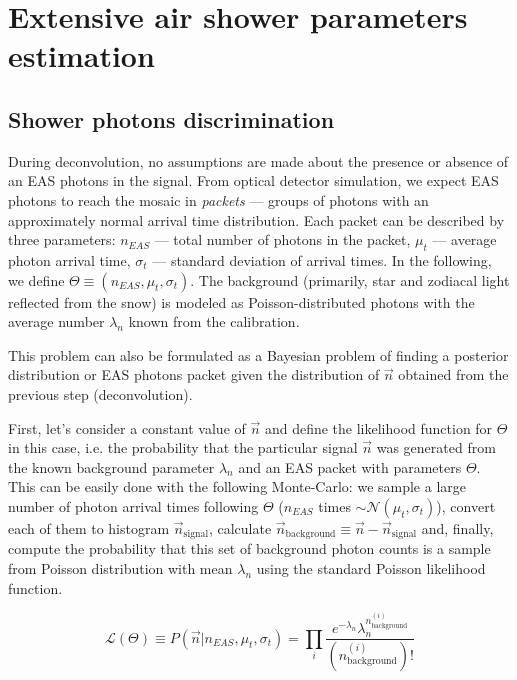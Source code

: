 \chapter{Extensive air shower parameters estimation}

\section{Shower photons discrimination}
\label{sec:signal-reconstruction}

During deconvolution, no assumptions are made about the presence or absence of an EAS photons in the signal. From optical detector simulation, we expect EAS photons to reach the mosaic in \textit{packets} --- groups of photons with an approximately normal arrival time distribution. Each packet can be described by three parameters: $n_{EAS}$ --- total number of photons in the packet, $\mu_t$ --- average photon arrival time, $\sigma_t$ --- standard deviation of arrival times. In the following, we define $\Theta \equiv (n_{EAS}, \mu_t, \sigma_t)$. The background (primarily, star and zodiacal light reflected from the snow) is modeled as Poisson-distributed photons with the average number $\lambda_{n}$ known from the calibration.

This problem can also be formulated as a Bayesian problem of finding a posterior distribution or EAS photons packet given the distribution of $\vec{n}$ obtained from the previous step (deconvolution).

First, let's consider a constant value of $\vec{n}$ and define the likelihood function for $\Theta$ in this case, i.e. the probability that the particular signal $\vec{n}$ was generated from the known background parameter $\lambda_{n}$ and an EAS packet with parameters $\Theta$. This can be easily done with the following Monte-Carlo: we sample a large number of photon arrival times following $\Theta$ ($n_{EAS}$ times $\sim \mathcal{N}(\mu_t, \sigma_t)$), convert each of them to histogram $\vec{n}_{\mathrm{signal}}$, calculate $\vec{n}_{\mathrm{background}} \equiv \vec{n} - \vec{n}_{\mathrm{signal}}$ and, finally, compute the probability that this set of background photon counts is a sample from Poisson distribution with mean $\lambda_{n}$ using the standard Poisson likelihood function.

\begin{equation}
	\mathcal{L}(\Theta) \equiv P(\vec{n} | n_{EAS}, \mu_t, \sigma_t) = \prod_{i} \frac{e^{-\lambda_n} \lambda_n^{n_{\mathrm{background}}^{(i)}}}{(n_{\mathrm{background}}^{(i)})!}
\end{equation}

